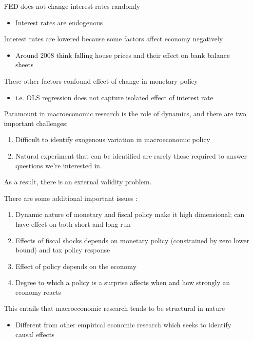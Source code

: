 \documentclass{beamer}
\begin{document}
\begin{frame}
  FED does not change interest rates randomly
  \begin{itemize}
    \item Interest rates are endogenous    
  \end{itemize}
  \medskip
  Interest rates are lowered because some factors affect economy negatively
  \begin{itemize}
    \item Around 2008 think falling house prices and their effect on bank balance sheets
  \end{itemize}
  \medskip
  These other factors confound effect of change in monetary policy
  \begin{itemize}
    \item i.e. OLS regression does not capture isolated effect of interest rate
  \end{itemize}
\end{frame}

\begin{frame}
  Paramount in macroeconomic research is the role of dynamics, and there are two important challenges:
  \begin{enumerate}
    \item Difficult to identify exogenous variation in macroeconomic policy
    \item Natural experiment that can be identified are rarely those required to answer questions we're interested in. 
  \end{enumerate}
  \medskip
  As a result, there is an external validity problem.
\end{frame}


\begin{frame}
 There are some additional important issues : 
 \begin{enumerate}
   \item Dynamic nature of monetary and fiscal policy make it high dimensional; can have effect on both short and long run
   \item Effects of fiscal shocks depends on monetary policy (constrained by zero lower bound) and tax policy response
   \item Effect of policy depends on the economy
   \item Degree to which a policy is a surprise affects when and how strongly an economy reacts  
 \end{enumerate}
 \medskip
 This entails that macroeconomic research tends to be structural in nature
 \begin{itemize}
   \item Different from other empirical economic research which seeks to identify causal effects
 \end{itemize} 
\end{frame}
\end{document}
